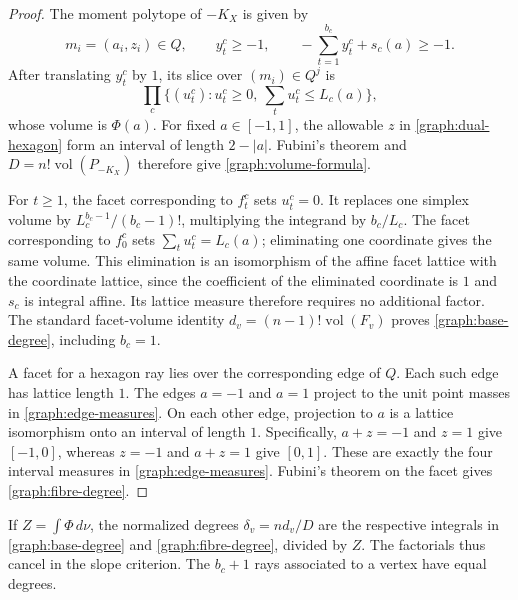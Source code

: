 \begin{proof}
The moment polytope of $-K_X$ is given by
\[
 m_i=(a_i,z_i)\in Q,\qquad y^c_t\ge-1,\qquad
 -\sum_{t=1}^{b_c}y^c_t+s_c(a)\ge-1.
\]
After translating $y^c_t$ by $1$, its slice over $(m_i)\in Q^j$ is
\[
 \prod_c\{(u^c_t):u^c_t\ge0,\ \sum_tu^c_t\le L_c(a)\},
\]
whose volume is $\Phi(a)$.  For fixed $a\in[-1,1]$, the allowable
$z$ in \eqref{graph:dual-hexagon} form an interval of length $2-|a|$.
Fubini's theorem and $D=n!\operatorname{vol}(P_{-K_X})$ therefore give
\eqref{graph:volume-formula}.

For $t\ge1$, the facet corresponding to $f^c_t$ sets $u^c_t=0$.
It replaces one simplex volume by
$L_c^{b_c-1}/(b_c-1)!$, multiplying the integrand by $b_c/L_c$.
The facet corresponding to $f^c_0$ sets
$\sum_tu^c_t=L_c(a)$; eliminating one coordinate gives the same
volume.  This elimination is an isomorphism of the affine facet
lattice with the coordinate lattice, since the coefficient of the
eliminated coordinate is $1$ and $s_c$ is integral affine.
Its lattice measure therefore requires no additional factor. The standard
facet-volume identity $d_v=(n-1)!\operatorname{vol}(F_v)$ proves
\eqref{graph:base-degree}, including $b_c=1$.

A facet for a hexagon ray lies over the corresponding edge of $Q$.
Each such edge has lattice length $1$.  The edges $a=-1$ and $a=1$
project to the unit point masses in \eqref{graph:edge-measures}.
On each other edge, projection to $a$ is a lattice isomorphism onto
an interval of length $1$.  Specifically, $a+z=-1$ and $z=1$ give
$[-1,0]$, whereas $z=-1$ and $a+z=1$ give $[0,1]$.  These are exactly
the four interval measures in \eqref{graph:edge-measures}.
Fubini's theorem on the facet gives \eqref{graph:fibre-degree}.
\end{proof}

\begin{remark}\label{graph:normalized-degrees}
If $Z=\int\Phi\,d\nu$, the normalized degrees
$\delta_v=nd_v/D$ are the respective integrals in
\eqref{graph:base-degree} and \eqref{graph:fibre-degree}, divided by $Z$.
The factorials thus cancel in the slope criterion.
The $b_c+1$ rays associated to a vertex have equal degrees.
\end{remark}

